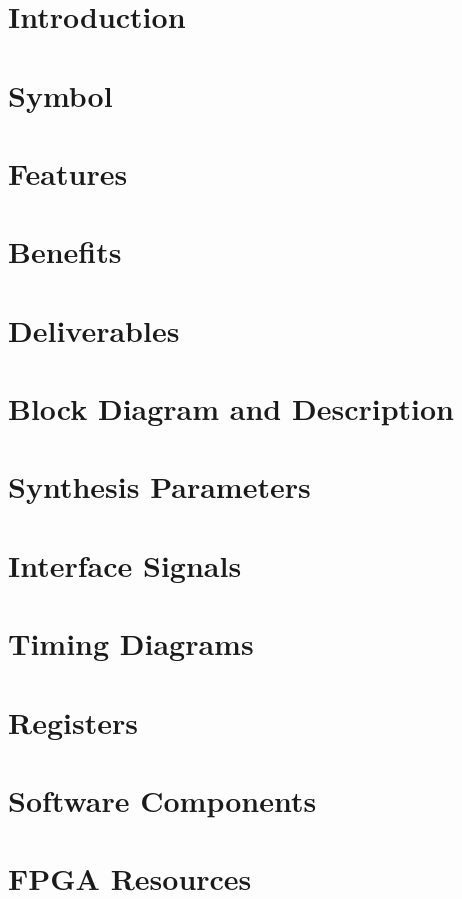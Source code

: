 \documentclass{../../submodules/TEX/document/ug/ug}
\begin{document}
\maketitle
\cleardoublepage
\tableofcontents
\listoftables
\listoffigures
\cleardoublepage

\section{Introduction}


\section{Symbol}


\section{\textcolor[rgb]{0,0,0}{Features}}


\section{\textcolor[rgb]{0,0,0}{Benefits}}


\section{\textcolor[rgb]{0,0,0}{Deliverables}}


\section{\textcolor[rgb]{0,0,0}{Block Diagram and Description}}


\section{\textcolor[rgb]{0,0,0}{Synthesis Parameters}}


\section{Interface Signals}


\section{Timing Diagrams}


\section{Registers}


\section{Software Components}


\section*{FPGA Resources}


%
%
\end{document}
